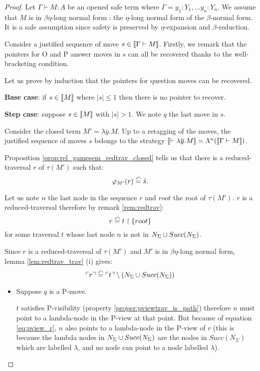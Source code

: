 \begin{proof}
Let $\Gamma \vdash M : A$ be an opened safe term where $\Gamma = y_1:Y_1, \ldots y_n:Y_n$.
We assume that $M$ is in $\beta \eta$-long normal form : the $\eta$-long normal form of the $\beta$-normal form.
It is a safe assumption since safety is preserved by $\eta$-expansion and $\beta$-reduction.

Consider a justified sequence of move $s \in {[\![\Gamma \vdash M ]\!]}$. Firstly,
we remark that the pointers for O and P answer moves in $s$ can all be
recovered thanks to the well-bracketing condition.

Let us prove by induction that the pointers for question moves can be recovered.

\textbf{Base case}: if $s \in {[\![M ]\!]}$ where $|s| \leq 1$ then there is no pointer to recover.

\textbf{Step case}: suppose $s \in {[\![M ]\!]}$ with $|s| > 1$. We note $q$ the last move in $s$.

Consider the closed term $M'  = \lambda \overline{y} . M$.
Up to a retagging of the moves, the justified sequence of moves $s$ belongs to the strategy
${[\![ \vdash \lambda \overline{y} . M ]\!]} = \Lambda^n({[\![ \Gamma \vdash M ]\!]})$.

Proposition \ref{prop:rel_gamesem_redtrav_closed} tells us that
there is a reduced-traversal $r$ of $\tau(M')$ such that:
$$\varphi_{M'}(r) \stackrel{\curvearrowleft}{=} \tilde{s}.$$

Let us note $n$ the last node in the sequence $r$
and $root$ the root of $\tau(M')$.
$r$ is a reduced-traversal therefore by remark \ref{rem:redtrav}:
$$ r \stackrel{\curvearrowleft}{=} t \upharpoonright \{ root \} $$
for some traversal $t$ whose last node $n$ is not in $N_\Sigma \cup Succ(N_\Sigma)$.

Since $r$ is a reduced-traversal of $\tau(M')$ and $M'$ is in $\beta \eta$-long normal form,
lemma \ref{lem:redtrav_trav} (i) gives:
\begin{equation}
 \ulcorner r \urcorner \stackrel{\curvearrowleft}{=} \ulcorner t \urcorner \setminus \left( N_\Sigma \cup Succ(N_\Sigma) \right) \label{eq:pview_r}
\end{equation}

\begin{itemize}
\item Suppose $q$ is a P-move.

$t$ satisfies P-visibility (property \ref{proper:pviewtrav_is_path}) therefore $n$ must point
to a lambda-node in the P-view at that point. But because of equation \ref{eq:pview_r}, $n$
also points to a lambda-node in the P-view of $r$ (this is because the lambda nodes in
$N_\Sigma \cup Succ(N_\Sigma)$ are the nodes in $Succ(N_{\Sigma})$
which are labelled $\lambda$, and no node can point to a node labelled $\lambda$).



\end{itemize}
\end{proof}
